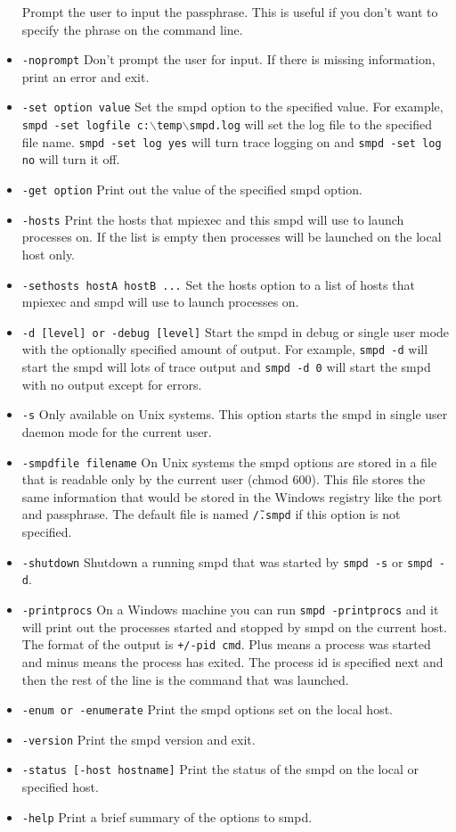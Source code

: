 \documentclass[dvipdfm,11pt]{article}
\begin{document}
\begin{itemize}
Prompt the user to input the passphrase.  This is useful if you don't want to 
specify the phrase on the command line.
\item \texttt{-noprompt}
Don't prompt the user for input.  If there is missing information, print an error
and exit.
\item \texttt{-set option value}
Set the smpd option to the specified value.  For example, \texttt{smpd -set logfile c:$\backslash$temp$\backslash$smpd.log} will set the log file to the 
specified file name.  \texttt{smpd -set log yes} will turn trace logging on and
\texttt{smpd -set log no} will turn it off.
\item \texttt{-get option}
Print out the value of the specified smpd option.
\item \texttt{-hosts}
Print the hosts that mpiexec and this smpd will use to launch processes on.  
If the list is empty then processes will be launched on the local host only.
\item \texttt{-sethosts hostA hostB ...}
Set the hosts option to a list of hosts that mpiexec and smpd will use to launch
processes on.
\item \texttt{-d [level] or -debug [level]}
Start the smpd in debug or single user mode with the optionally specified amount
of output.  For example, \texttt{smpd -d} will start the smpd will lots of trace
output and \texttt{smpd -d 0} will start the smpd with no output except for errors.
\item \texttt{-s}
Only available on Unix systems.  This option starts the smpd in single user daemon
mode for the current user.
\item \texttt{-smpdfile filename}
On Unix systems the smpd options are stored in a file that is readable only by
the current user (chmod 600).  This file stores the same information that would
be stored in the Windows registry like the port and passphrase.  The default
file is named \texttt{\~/.smpd} if this option is not specified.
\item \texttt{-shutdown}
Shutdown a running smpd that was started by \texttt{smpd -s} or \texttt{smpd -d}.
\item \texttt{-printprocs}
On a Windows machine you can run \texttt{smpd -printprocs} and it will print out
the processes started and stopped by smpd on the current host.  The format of the
output is \texttt{+/-pid cmd}.  Plus means a process was started and minus means
the process has exited.  The process id is specified next and then the rest of the line
is the command that was launched.
\item \texttt{-enum or -enumerate}
Print the smpd options set on the local host.
\item \texttt{-version}
Print the smpd version and exit.
\item \texttt{-status [-host hostname]}
Print the status of the smpd on the local or specified host.
\item \texttt{-help}
Print a brief summary of the options to smpd.
\end{itemize}
\end{document}

